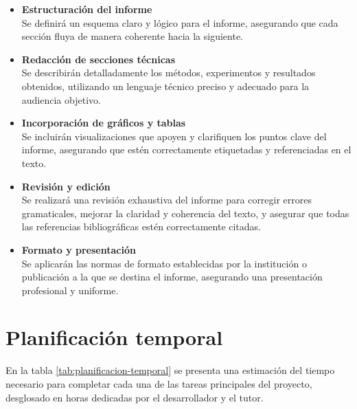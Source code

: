 \begin{itemize}
    \item \textbf{Estructuración del informe} \\
          Se definirá un esquema claro y lógico para el informe, asegurando que cada sección fluya de manera coherente hacia la siguiente.

    \item \textbf{Redacción de secciones técnicas} \\
          Se describirán detalladamente los métodos, experimentos y resultados obtenidos, utilizando un lenguaje técnico preciso y adecuado para la audiencia objetivo.

    \item \textbf{Incorporación de gráficos y tablas} \\
          Se incluirán visualizaciones que apoyen y clarifiquen los puntos clave del informe, asegurando que estén correctamente etiquetadas y referenciadas en el texto.

    \item \textbf{Revisión y edición} \\
          Se realizará una revisión exhaustiva del informe para corregir errores gramaticales, mejorar la claridad y coherencia del texto, y asegurar que todas las referencias bibliográficas estén correctamente citadas.

    \item \textbf{Formato y presentación} \\
          Se aplicarán las normas de formato establecidas por la institución o publicación a la que se destina el informe, asegurando una presentación profesional y uniforme.
\end{itemize}

\section{Planificación temporal}

En la tabla \ref{tab:planificacion-temporal} se presenta una estimación del tiempo necesario para completar cada una de las tareas principales del proyecto, desglosado en horas dedicadas por el desarrollador y el tutor.


